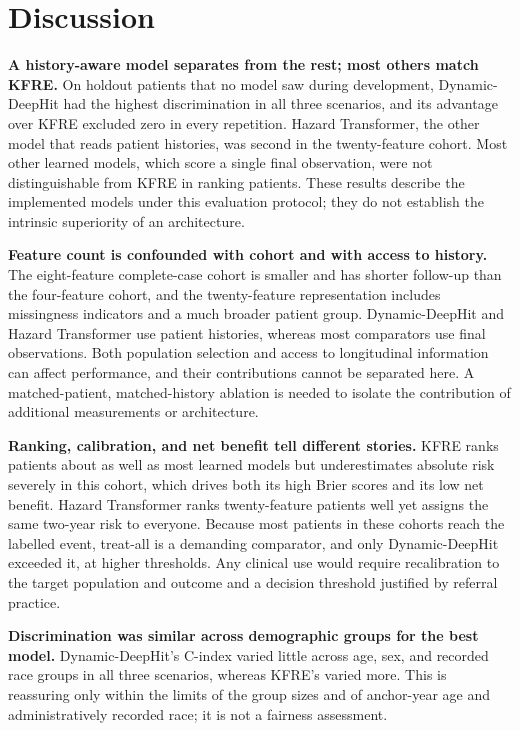 \documentclass[10pt,letterpaper]{article}
\begin{document}
\section*{Discussion}

\textbf{A history-aware model separates from the rest; most others match KFRE.} On holdout patients that no model saw during development, Dynamic-DeepHit had the highest discrimination in all three scenarios, and its advantage over KFRE excluded zero in every repetition. Hazard Transformer, the other model that reads patient histories, was second in the twenty-feature cohort. Most other learned models, which score a single final observation, were not distinguishable from KFRE in ranking patients. These results describe the implemented models under this evaluation protocol; they do not establish the intrinsic superiority of an architecture.

\textbf{Feature count is confounded with cohort and with access to history.} The eight-feature complete-case cohort is smaller and has shorter follow-up than the four-feature cohort, and the twenty-feature representation includes missingness indicators and a much broader patient group. Dynamic-DeepHit and Hazard Transformer use patient histories, whereas most comparators use final observations. Both population selection and access to longitudinal information can affect performance, and their contributions cannot be separated here. A matched-patient, matched-history ablation is needed to isolate the contribution of additional measurements or architecture.

\textbf{Ranking, calibration, and net benefit tell different stories.} KFRE ranks patients about as well as most learned models but underestimates absolute risk severely in this cohort, which drives both its high Brier scores and its low net benefit. Hazard Transformer ranks twenty-feature patients well yet assigns the same two-year risk to everyone. Because most patients in these cohorts reach the labelled event, treat-all is a demanding comparator, and only Dynamic-DeepHit exceeded it, at higher thresholds. Any clinical use would require recalibration to the target population and outcome and a decision threshold justified by referral practice.

\textbf{Discrimination was similar across demographic groups for the best model.} Dynamic-DeepHit's C-index varied little across age, sex, and recorded race groups in all three scenarios, whereas KFRE's varied more. This is reassuring only within the limits of the group sizes and of anchor-year age and administratively recorded race; it is not a fairness assessment.
\end{document}
